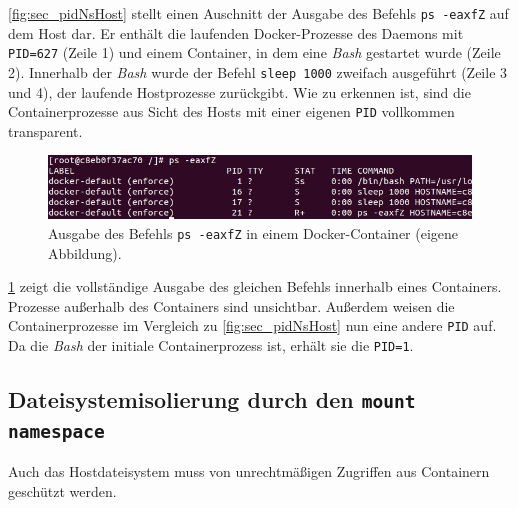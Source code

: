 \documentclass[../main.tex]{subfiles}
\begin{document}
			\fig \ref{fig:sec_pidNsHost} stellt einen Auschnitt der Ausgabe des Befehls \texttt{ps -eaxfZ} auf dem Host dar. Er enthält die laufenden Docker-Prozesse des Daemons mit \texttt{PID=627} (Zeile 1) und einem Container, in dem eine \emph{Bash} gestartet wurde (Zeile 2). Innerhalb der \emph{Bash} wurde der Befehl \texttt{sleep 1000} zweifach ausgeführt (Zeile 3 und 4), der laufende Hostprozesse zurückgibt. Wie zu erkennen ist, sind die Containerprozesse aus Sicht des Hosts mit einer eigenen \texttt{PID} vollkommen transparent.

			\begin{figure}[h]
					\centering
					\includegraphics[width=1.0\textwidth]{./images/sec_pidNsContainer.jpg}
					\caption{Ausgabe des Befehls \texttt{ps -eaxfZ} in einem Docker-Container (eigene Abbildung).}
					\label{fig:sec_pidNsContainer}
			\end{figure}

			\fig \ref{fig:sec_pidNsContainer} zeigt die vollständige Ausgabe des gleichen Befehls innerhalb eines Containers. Prozesse außerhalb des Containers sind unsichtbar. Außerdem weisen die Containerprozesse im Vergleich zu \fig \ref{fig:sec_pidNsHost} nun eine andere \texttt{PID} auf. Da die \emph{Bash} der initiale Containerprozess ist, erhält sie die \texttt{PID=1}.






    \subsection{Dateisystemisolierung durch den \texttt{mount namespace}}
			Auch das Hostdateisystem muss von unrechtmäßigen Zugriffen aus Containern geschützt werden.
\end{document}
